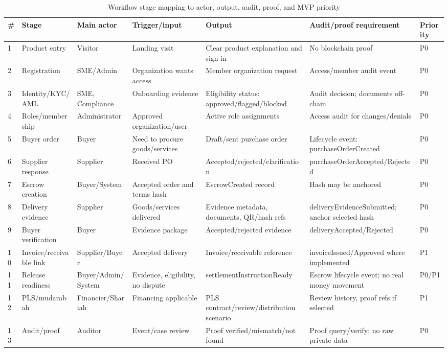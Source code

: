 \documentclass[conference]{IEEEtran}
\begin{document}
\begin{table}[t]
\caption{Workflow stage mapping to actor, output, audit, proof, and MVP priority}
\label{tab:workflow}
\scriptsize
\begin{tabularx}{\textwidth}{P{.5cm} P{2.4cm} P{2.2cm} P{3.2cm} P{3.2cm} P{2.5cm} P{1.4cm}}
\toprule
\# & Stage & Main actor & Trigger/input & Output & Audit/proof requirement & Priority \\
 & Product entry & Visitor & Landing visit & Clear product explanation and sign-in & No blockchain proof & P0 \\
2 & Registration & SME/Admin & Organization wants access & Member organization request & Access/member audit event & P0 \\
3 & Identity/KYC/AML & SME, Compliance & Onboarding evidence & Eligibility status: approved/flagged/blocked & Audit decision; documents off-chain & P0 \\
4 & Roles/membership & Administrator & Approved organization/user & Active role assignments & Access audit for changes/denials & P0 \\
5 & Buyer order & Buyer & Need to procure goods/services & Draft/sent purchase order & Lifecycle event: purchaseOrderCreated & P0 \\
6 & Supplier response & Supplier & Received PO & Accepted/rejected/clarification & purchaseOrderAccepted/Rejected & P0 \\
7 & Escrow creation & Buyer/System & Accepted order and terms hash & EscrowCreated record & Hash may be anchored & P0 \\
8 & Delivery evidence & Supplier & Goods/services delivered & Evidence metadata, documents, QR/hash refs & deliveryEvidenceSubmitted; anchor selected hash & P0 \\
9 & Buyer verification & Buyer & Evidence package & Accepted/rejected evidence & deliveryAccepted/Rejected & P0 \\
10 & Invoice/receivable link & Supplier/Buyer & Accepted delivery & Invoice/receivable reference & invoiceIssued/Approved where implemented & P1 \\
11 & Release readiness & Buyer/Admin/System & Evidence, eligibility, no dispute & settlementInstructionReady & Escrow lifecycle event; no real money movement & P0/P1 \\
12 & PLS/mudarabah & Financier/Shariah & Financing applicable & PLS contract/review/distribution scenario & Review history, proof refs if selected & P1 \\
13 & Audit/proof & Auditor & Event/case review & Proof verified/mismatch/not found & Proof query/verify; no raw private data & P0 \\

\end{tabularx}
\end{table}
\end{document}
